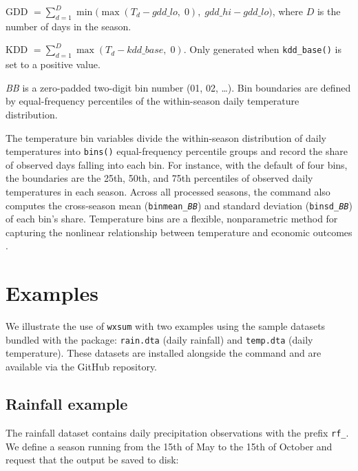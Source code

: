 \begin{center}
\begin{threeparttable}
\begin{tablenotes}
\item[$^{b}$] GDD $= \sum_{d=1}^{D} \min\bigl(\max(T_d - \mathit{gdd\_lo},\; 0),\; \mathit{gdd\_hi} - \mathit{gdd\_lo}\bigr)$, where $D$ is the number of days in the season.
\item[$^{c}$] KDD $= \sum_{d=1}^{D} \max(T_d - \mathit{kdd\_base},\; 0)$. Only generated when \texttt{kdd\_base()} is set to a positive value.
\item[$^{d}$] \textit{BB} is a zero-padded two-digit bin number (01, 02, \ldots). Bin boundaries are defined by equal-frequency percentiles of the within-season daily temperature distribution.
\end{tablenotes}
\end{threeparttable}
\end{center}

The temperature bin variables divide the within-season distribution of daily temperatures into \texttt{bins()} equal-frequency percentile groups and record the share of observed days falling into each bin. For instance, with the default of four bins, the boundaries are the 25th, 50th, and 75th percentiles of observed daily temperatures in each season. Across all processed seasons, the command also computes the cross-season mean (\texttt{binmean\_\textit{BB}}) and standard deviation (\texttt{binsd\_\textit{BB}}) of each bin's share. Temperature bins are a flexible, nonparametric method for capturing the nonlinear relationship between temperature and economic outcomes \citep{DescheneGreenstone07}.

\section{Examples}

We illustrate the use of \texttt{wxsum} with two examples using the sample datasets bundled with the package: \texttt{rain.dta} (daily rainfall) and \texttt{temp.dta} (daily temperature). These datasets are installed alongside the command and are available via the GitHub repository.

\subsection{Rainfall example}

The rainfall dataset contains daily precipitation observations with the prefix \texttt{rf\_}. We define a season running from the 15th of May to the 15th of October and request that the output be saved to disk:

